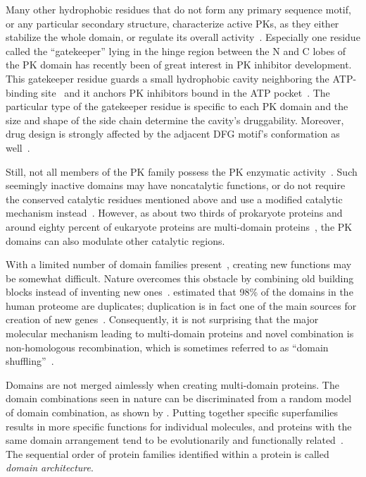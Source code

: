   Many other hydrophobic residues that do not form any primary sequence motif, or any
  particular secondary structure, characterize active PKs, as they either stabilize
  the whole domain, or regulate its overall
  activity~\cite{kornev2006surface, kornev2010defining}.
  Especially one residue called the ``gatekeeper'' lying in the hinge region between the N
  and C lobes of the PK domain has recently been of great interest in PK inhibitor
  development.
  This gatekeeper residue guards a small hydrophobic cavity neighboring the ATP-binding
  site~\cite{noble2004protein} and it anchors PK inhibitors bound in the ATP
  pocket~\cite{tong1997highly, azam2008activation}.
  The particular type of the gatekeeper residue is specific to each PK domain and the
  size and shape of the side chain determine the cavity's druggability.
  Moreover, drug design is strongly affected by the adjacent DFG motif's conformation as
  well~\cite{zuccotto2010through}.

  Still, not all members of the PK family possess the PK enzymatic
  activity~\cite{zervas2002integrin, morrison2001ksr, kroiher2001deceiving}.
  Such seemingly inactive domains may have noncatalytic functions, or do not require the
  conserved catalytic residues mentioned above and use a modified catalytic mechanism
  instead~\cite{manning2002protein}.
  However, as about two thirds of prokaryote proteins and around eighty percent of
  eukaryote proteins are multi-domain
  proteins~\cite{teichmann1998structural, gerstein1998representative}, the PK domains
  can also modulate other catalytic regions.

\label{intro:multi}

  With a limited number of domain families
  present~\cite{chothia1992one, wolf2000estimating}, creating new functions may be
  somewhat difficult.
  Nature overcomes this obstacle by combining old building blocks instead of inventing new
  ones~\cite{apic2001insight}.
  \citet{muller2002structural} estimated that 98\% of the domains in the human proteome
  are duplicates; duplication is in fact one of the main sources for creation of new
  genes~\cite{lynch2000evolutionary}.
  Consequently, it is not surprising that the major molecular mechanism leading to
  multi-domain proteins and novel combination is non-homologous recombination, which is
  sometimes referred to as ``domain shuffling''~\cite{vogel2004structure}.

  Domains are not merged aimlessly when creating multi-domain proteins.
  The domain combinations seen in nature can be discriminated from a random model of
  domain combination, as shown by \citet{apic2003multi}.
  Putting together specific superfamilies results in more specific functions for
  individual molecules, and proteins with the same domain arrangement tend to be
  evolutionarily and functionally
  related~\cite{hegyi2001annotation, bashton2002geometry, vogel2004structure}.
  The sequential order of protein families identified within a protein is called
  \emph{domain architecture}.

